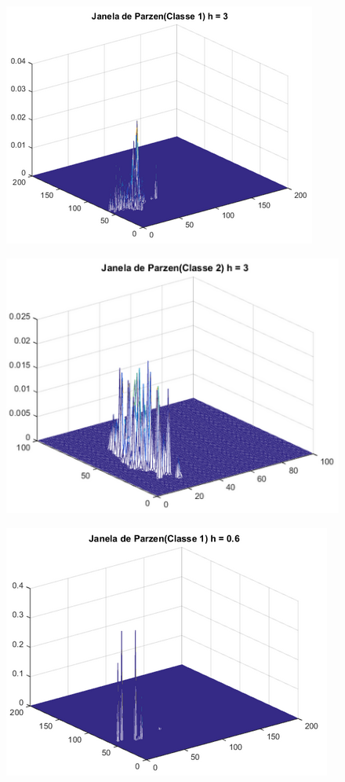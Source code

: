 \documentclass[12pt,twoside]{report}
\begin{document}
\begin{figure}[ht]
    \centering
    \includegraphics[scale=0.75]{parzen_c1_h3}
    \caption{}
    \label{fig:parzen_c1_h3}
\end{figure}

\begin{figure}[ht]
    \centering
    \includegraphics[scale=0.75]{parzen_c2_h3}
    \caption{}
    \label{fig:parzen_c2_h3}
\end{figure}

\begin{figure}[ht]
    \centering
    \includegraphics[scale=0.75]{parzen_c1_h06}
    \caption{}
    \label{fig:parzen_c1_h06}
\end{figure}
\end{document}
